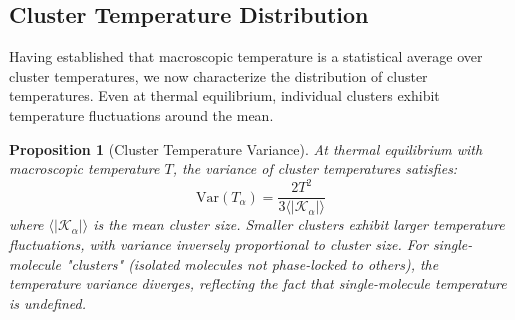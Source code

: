 \documentclass[12pt,a4paper]{article}
\newtheorem{proposition}[theorem]{Proposition}
\theoremstyle{definition}
\theoremstyle{remark}
\begin{document}
\subsection{Cluster Temperature Distribution}

Having established that macroscopic temperature is a statistical average over cluster temperatures, we now characterize the distribution of cluster temperatures. Even at thermal equilibrium, individual clusters exhibit temperature fluctuations around the mean.

\begin{proposition}[Cluster Temperature Variance]
\label{prop:cluster_variance}
At thermal equilibrium with macroscopic temperature $T$, the variance of cluster temperatures satisfies:
\begin{equation}
\text{Var}(T_\alpha) = \frac{2 T^2}{3 \langle |\mathcal{K}_\alpha| \rangle}
\label{eq:cluster_variance}
\end{equation}
where $\langle |\mathcal{K}_\alpha| \rangle$ is the mean cluster size. Smaller clusters exhibit larger temperature fluctuations, with variance inversely proportional to cluster size. For single-molecule "clusters" (isolated molecules not phase-locked to others), the temperature variance diverges, reflecting the fact that single-molecule temperature is undefined.
\end{proposition}
\end{document}
